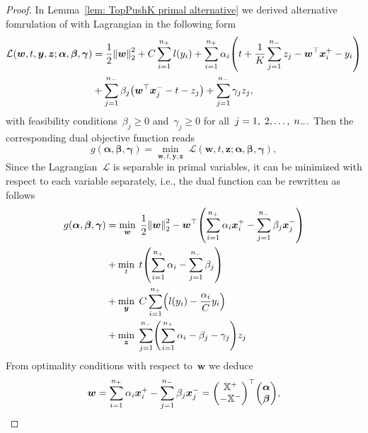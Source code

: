 \begin{proof}
  In Lemma~\ref{lem: TopPushK primal alternative} we derived alternative fomrulation of \TopPushK with Lagrangian in the following form
  \begin{align*}
    \mathcal{L}(\bm{w}, t, \bm{y}, \bm{z}; \bm{\alpha}, \bm{\beta}, \bm{\gamma})
     & = \frac{1}{2} \norm{\bm{w}}_{2}^{2}
       + C \sum_{i = 1}^{\npos} l(y_i)
       + \sum_{i = 1}^{\npos} \alpha_i \Brac{t + \frac{1}{K} \sum_{j = 1}^{\nneg} z_j - \bm{w}^{\top} \bm{x}^+_i - y_i} \\
     & + \sum_{j = 1}^{\nneg} \beta_j \Brac{\bm{w}^{\top} \bm{x}^-_j - t - z_j}
       + \sum_{j = 1}^{\nneg} \gamma_j z_j,
  \end{align*}
  with feasibility conditions~$\beta_j \geq 0$ and~$\gamma_j \geq 0$ for all~$j = 1, \; 2, \ldots, \; n_{-}.$ Then the corresponding dual objective function reads
  \begin{equation*}
    g(\bm{\alpha}, \bm{\beta}, \bm{\gamma})
      = \min_{\bm{w}, t, \bm{y}, \bm{z}} \; \mathcal{L}(\bm{w}, t, \bm{z}; \bm{\alpha}, \bm{\beta}, \bm{\gamma}),
  \end{equation*}
  Since the Lagrangian~$\mathcal{L}$ is separable in primal variables, it can be minimized with respect to each variable separately, i.e., the dual function can be rewritten as follows
  \begin{equation}\label{eq: TopPushK dual function}
    \begin{aligned}
      g(\bm{\alpha}, \bm{\beta}, \bm{\gamma})
        & = \min_{\bm{w}} \; \frac{1}{2} \norm{\bm{w}}_{2}^{2}
          - \bm{w}^{\top} \Brac{\sum_{i = 1}^{\npos} \alpha_i \bm{x}^+_i - \sum_{j = 1}^{\nneg} \beta_j \bm{x}^-_j} \\
        & + \min_{t} \; t \Brac{\sum_{i = 1}^{\npos} \alpha_i - \sum_{j = 1}^{\nneg} \beta_j} \\
        & + \min_{\bm{y}} \; C \sum_{i = 1}^{\npos} \Brac{l(y_i) - \frac{\alpha_i}{C}y_i} \\
        & + \min_{\bm{z}} \; \sum_{j = 1}^{\nneg} \Brac{\sum_{i = 1}^{\npos} \alpha_i - \beta_j - \gamma_j}z_j
    \end{aligned}
  \end{equation}
  From optimality conditions with respect to~$\bm{w}$ we deduce 
  \begin{equation*}
    \bm{w}
        = \sum_{i = 1}^{\npos} \alpha_i \bm{x}^+_i - \sum_{j = 1}^{\nneg} \beta_j \bm{x}^-_j
        = \Matrix{\X^+ \\ - \X^-}^\top \vecab,

\end{equation*}
\end{proof}
